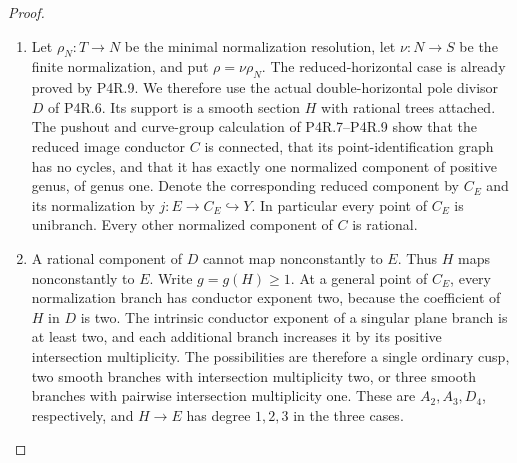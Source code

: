 \begin{proof}

\begin{enumerate}[label={$\langle1\rangle$\arabic*.},leftmargin=*]
\item Let $\rho_N:T\to N$ be the minimal normalization resolution,
let $\nu:N\to S$ be the finite normalization, and put
$\rho=\nu\rho_N$. The reduced-horizontal case is already
proved by P4R.9. We therefore use the actual double-horizontal
pole divisor $D$ of P4R.6. Its support is a smooth section $H$
with rational trees attached. The pushout and curve-group
calculation of P4R.7--P4R.9 show that the reduced image
conductor $C$ is connected, that its point-identification
graph has no cycles, and that it has exactly one normalized
component of positive genus, of genus one. Denote the
corresponding reduced component by $C_E$ and its normalization
by $j:E\to C_E\hookrightarrow Y$. In particular every point
of $C_E$ is unibranch. Every other normalized component of
$C$ is rational.

\item A rational component of $D$ cannot map nonconstantly to $E$.
Thus $H$ maps nonconstantly to $E$. Write $g=g(H)\ge1$.
At a general point of $C_E$, every normalization branch has
conductor exponent two, because the coefficient of $H$ in
$D$ is two. The intrinsic conductor exponent of a singular
plane branch is at least two, and each additional branch
increases it by its positive intersection multiplicity.
The possibilities are therefore a single ordinary cusp,
two smooth branches with intersection multiplicity two, or
three smooth branches with pairwise intersection multiplicity
one. These are $A_2,A_3,D_4$, respectively, and $H\to E$
has degree $1,2,3$ in the three cases.


\end{enumerate}
\end{proof}
